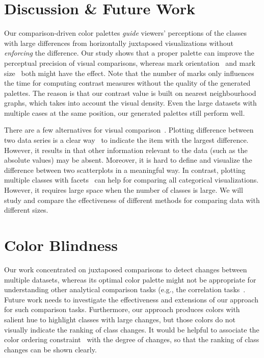 \section{Discussion \& Future Work}



Our comparison-driven color palettes \textit{guide} viewers' perceptions of the classes with large differences from horizontally juxtaposed visualizations without \textit{enforcing} the difference.
Our study shows that a proper palette can improve the perceptual precision of visual comparisons, whereas mark orientation~\cite{liu2021data} and mark size~\cite{smart2019measuring} both might  have the effect. Note that the number of marks only influences the time for computing contrast measures without the quality of the generated palettes. The reason is that our contrast value is built on nearest neighbourhood graphs, which takes into account the visual density. Even the large datasets with multiple cases at the same position, our generated palettes still perform well.


   
There are a few alternatives for visual comparison~\cite{Gleicher11}.  
Plotting difference between two data series is a clear way~\cite{Gleicher11} to indicate the item with the largest difference. However, it results in that other information  relevant to the data (such as the absolute values) may be absent. Moreover, it is hard to define and visualize the difference between two scatterplots in a meaningful way. 
In contrast, plotting multiple classes with facets~\cite{wickham2009elegant} can help for comparing all categorical visualizations. However, it requires large space when the number of classes is large. We will study and compare the effectiveness of different methods for comparing data with different sizes.


\section {Color Blindness}



Our work concentrated on juxtaposed comparisons to detect changes between multiple datasets, whereas its optimal color palette might not be appropriate for understanding other analytical comparison tasks (e.g., the correlation tasks~\cite{Ondov19}. Future work needs to investigate the effectiveness and extensions of our approach for such comparison tasks. Furthermore, our approach produces colors with salient hue to highlight classes with large changes, but those colors do not visually indicate the ranking of class changes.
It would be helpful to associate the color ordering constraint~\cite{Bujack18} with the degree of changes, so that the ranking of class changes can be shown clearly.


